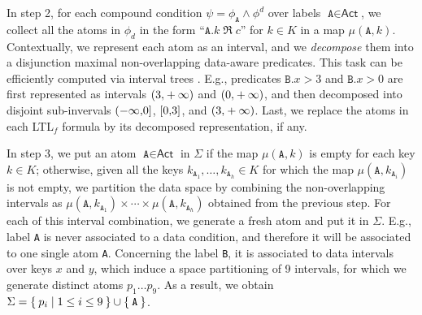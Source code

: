 In step 2, for each compound condition $\psi=\phi_{\texttt{A}}\wedge \phi^d$ over labels $\texttt{A}\in\textsf{Act}$, we collect all the atoms in $\phi_d$ in the form ``$\texttt{A}.k\;\Re\; c$'' for $k\in K$ in a map $\mu(\texttt{A},k)$. Contextually, we represent each atom as an interval, and we \textit{decompose} them
%
%
%
%
%
%
%
into a disjunction maximal non-overlapping data-aware predicates. This task can be efficiently computed via interval trees \cite{inttree}. E.g., predicates $\texttt{B}.x>3$ and $\texttt{B}.x>0$ are first represented as intervals $\interval({3,+\infty})$ and $\interval({0,+\infty})$, and then decomposed into disjoint sub-invervals $\interval({-\infty,0}]$, $\interval[{0,3}]$, and $\interval({3,+\infty})$. Last, we replace the atoms in each LTL$_f$ formula by its decomposed representation, if any.


In step 3, we put an atom $\texttt{A}\in\textsf{Act}$ in $\Sigma$ if the map $\mu(\texttt{A},k)$ is empty for each key $k\in K$; otherwise, given all the keys $k_{\texttt{A}_1},\dots,k_{\texttt{A}_h}\in K$ for which the map $\mu(\texttt{A},k_{\texttt{A}_i})$ is not empty, we partition the data space by combining the non-overlapping intervals as $\mu(\texttt{A},k_{\texttt{A}_1})\times\cdots\times\mu(\texttt{A},k_{\texttt{A}_h})$ obtained from the previous step. For each of this interval combination, we generate a fresh atom and put it in $\Sigma$. E.g., label \texttt{A} is never associated to a data condition, and therefore it will be associated to one single atom \texttt{A}. Concerning the label \texttt{B}, it is associated to data intervals over keys $x$ and $y$, which induce a space partitioning of 9 intervals, for which we generate distinct atoms $p_1\dots p_9$. As a result, we obtain $\Sigma=\Set{p_i|1\leq i\leq 9}\cup\Set{\texttt{A}}$.


